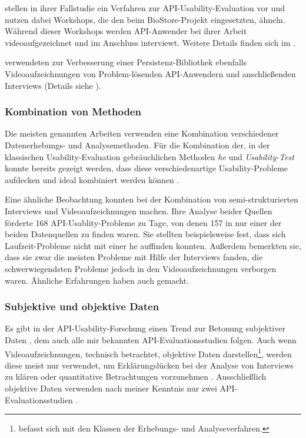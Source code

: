 \cite{Grill:2012jm} stellen in ihrer Fallstudie ein Verfahren zur API-Usability-Evaluation vor und nutzen dabei Workshops, die den beim BioStore-Projekt eingesetzten, ähneln. Während dieser Workshops werden API-Anwender bei ihrer Arbeit videoaufgezeichnet und im Anschluss interviewt. Weitere Details finden sich im .

\cite{Piccioni:2013uq} verwendeten zur Verbesserung einer Persistenz-Bibliothek ebenfalls Videoaufzeichnungen von Problem-lösenden API-Anwendern und anschließenden Interviews (Details siehe ).


\subsubsection{Kombination von Methoden}

Die meisten genannten Arbeiten verwenden eine Kombination verschiedener Datenerhebungs- und Analysemethoden. Für die Kombination der, in der klassischen Usability-Evaluation gebräuchlichen Methoden \textit{\acrlong{he}} \citep{Nielsen:1990bw} und \textit{Usability-Test} \citep{Faulkner:2003wn} konnte bereits gezeigt werden, dass diese verschiedenartige Usability-Probleme aufdecken und ideal kombiniert werden können \citep{Fu:2002tp}.

Eine ähnliche Beobachtung konnten \cite{Grill:2012jm} bei der Kombination von semi-strukturierten Interviews und Videoaufzeichnungen machen. Ihre Analyse beider Quellen förderte 168 API-Usablity-Probleme zu Tage, von denen 157 in nur einer der beiden Datenquellen zu finden waren. Sie stellten beispielsweise fest, dass sich Laufzeit-Probleme nicht mit einer \gls{he} auffinden konnten. Außerdem bemerkten sie, dass sie zwar die meisten Probleme mit Hilfe der Interviews fanden, die schwerwiegendsten Probleme jedoch in den Videoaufzeichnungen verborgen waren. Ähnliche Erfahrungen haben auch \cite{Piccioni:2013uq} gemacht.


\subsubsection{Subjektive und objektive Daten}
\label{sec:objektive-vs-subjektive-Daten}

Es gibt in der API-Usability-Forschung einen Trend zur Betonung subjektiver Daten \citep{Rosson:2001uf,Stylos:2008cu,Robillard:2010bh}, dem auch alle mir bekannten API-Evaluationsstudien folgen. Auch wenn Videoaufzeichnungen, technisch betrachtet, objektive Daten darstellen\footnote{ befasst sich mit den Klassen der Erhebungs- und Analyseverfahren.}, werden diese meist nur verwendet, um Erklärungslücken bei der Analyse von Interviews zu klären \citep[vgl.][]{Letondal:2006dy,Grill:2012jm,Tenny:2011jp} oder quantitative Betrachtungen vorzunehmen \citep[vgl.][]{Piccioni:2013uq}. Ausschließlich objektive Daten verwenden nach meiner Kenntnis nur zwei API-Evaluationsstudien \citep{deSouza:ek,Watson:2009bm}.

